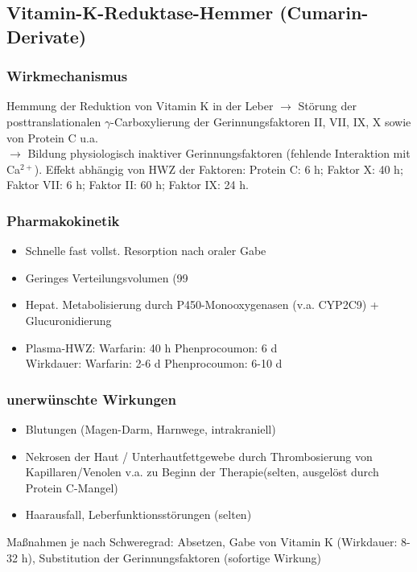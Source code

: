 \documentclass[10pt,a4paper]{report}
\begin{document}
\subsection{Vitamin-K-Reduktase-Hemmer (Cumarin-Derivate)} %
\label{ssub:vitamin_k_reduktase_hemmer_}
\subsubsection{Wirkmechanismus} %
\label{par:wirkmechanismus}
Hemmung der Reduktion von Vitamin K in der Leber $\rightarrow$ Störung der posttranslationalen $\gamma$-Carboxylierung der Gerinnungsfaktoren II, VII, IX, X sowie von Protein C u.a. \\
$\rightarrow$ Bildung physiologisch inaktiver Gerinnungsfaktoren (fehlende Interaktion mit Ca$^{2+}$). Effekt abhängig von HWZ der Faktoren: Protein C: 6 h; Faktor X: 40 h; Faktor VII: 6 h;
Faktor II: 60 h; Faktor IX: 24 h.
\subsubsection{Pharmakokinetik} %
\label{par:pharmakokinetik}
\begin{itemize}
	\item Schnelle fast vollst. Resorption nach oraler Gabe
	\item Geringes Verteilungsvolumen (99 %
	\item Hepat. Metabolisierung durch P450-Monooxygenasen (v.a. CYP2C9) + Glucuronidierung
	\item Plasma-HWZ: 	Warfarin: 40 h 	Phenprocoumon: 6 d \\Wirkdauer:		Warfarin: 2-6 d 	Phenprocoumon: 6-10 d
\end{itemize}
\subsubsection{unerwünschte Wirkungen} %
\label{par:unerw_nschte_wirkungen}
\begin{itemize}
	\item Blutungen (Magen-Darm, Harnwege, intrakraniell)
	\item Nekrosen der Haut / Unterhautfettgewebe durch Thrombosierung von Kapillaren/Venolen v.a. zu Beginn der Therapie(selten, ausgelöst durch Protein C-Mangel)
	\item Haarausfall, Leberfunktionsstörungen (selten)
\end{itemize}
Maßnahmen je nach Schweregrad: Absetzen, Gabe von Vitamin K (Wirkdauer: 8-32 h), Substitution der Gerinnungsfaktoren (sofortige Wirkung)
\end{document}
